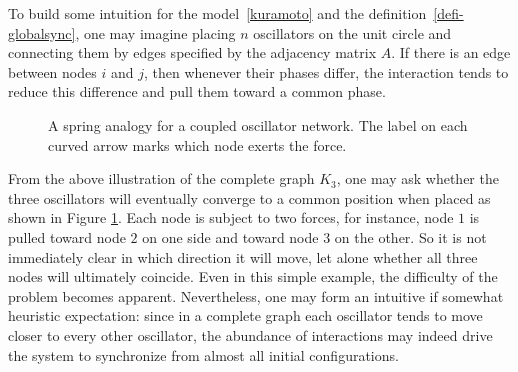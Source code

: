 \documentclass[11pt,reqno]{amsart}
\theoremstyle{definition}
\begin{document}
To build some intuition for the model~\eqref{kuramoto} and the
definition~\eqref{defi-globalsync}, one may imagine placing $n$ oscillators on
the unit circle and connecting them by edges specified by the adjacency matrix
$A$. If there is an edge between nodes $i$ and $j$, then whenever their phases
differ, the interaction tends to reduce this difference and pull them toward a
common phase.

\begin{figure}[H]
\centering
{}
\caption{A spring analogy for a coupled oscillator network. The label on each curved arrow marks which node exerts the force.}
\label{oscillators}
\end{figure}
From the above illustration of the complete graph $K_3$, one may ask whether
the three oscillators will eventually converge to a common position when placed
as shown in Figure \ref{oscillators}.
Each node is subject to two forces, for instance, node $1$ is pulled
toward node $2$ on one side and toward node $3$ on the other.
So it is not
immediately clear in which direction it will move, let alone whether all three
nodes will ultimately coincide.
Even in this simple example, the difficulty of the problem becomes apparent.
Nevertheless, one may form an intuitive if
somewhat heuristic expectation: since in a complete graph each oscillator tends
to move closer to every other oscillator, the abundance of interactions may
indeed drive the system to synchronize from almost all initial configurations.
\end{document}
